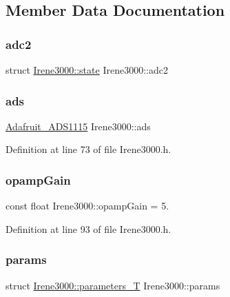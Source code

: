 \subsection{Member Data Documentation}
\mbox{\label{class_irene3000_aae3a95a1c83c766cd2f299ce471c337e}} 
\subsubsection{\texorpdfstring{adc2}{adc2}}
{\footnotesize\ttfamily struct \hyperlink{struct_irene3000_1_1state}{Irene3000\+::state} Irene3000\+::adc2\hspace{0.3cm}{\ttfamily [private]}}

\mbox{\label{class_irene3000_a1215e77ba761c9908d80d691f149e135}} 
\subsubsection{\texorpdfstring{ads}{ads}}
{\footnotesize\ttfamily \hyperlink{class_adafruit___a_d_s1115}{Adafruit\+\_\+\+A\+D\+S1115} Irene3000\+::ads\hspace{0.3cm}{\ttfamily [private]}}



Definition at line 73 of file Irene3000.\+h.

\mbox{\label{class_irene3000_a4e588985ca74e5076029d5dee81034f2}} 
\subsubsection{\texorpdfstring{opamp\+Gain}{opampGain}}
{\footnotesize\ttfamily const float Irene3000\+::opamp\+Gain = 5.\hspace{0.3cm}{\ttfamily [private]}}



Definition at line 93 of file Irene3000.\+h.

\mbox{\label{class_irene3000_a136585a5ee7f9ac6ab52175fa153f8e3}} 
\subsubsection{\texorpdfstring{params}{params}}
{\footnotesize\ttfamily struct \hyperlink{struct_irene3000_1_1parameters___t}{Irene3000\+::parameters\+\_\+T} Irene3000\+::params\hspace{0.3cm}{\ttfamily [private]}}


